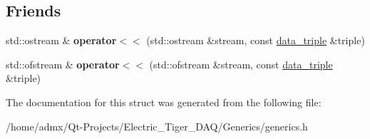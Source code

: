 \subsection*{Friends}
\begin{DoxyCompactItemize}
\item 
\hypertarget{structdata__triple_ae1f2fcec0b69760f3a5a9b97d13ec84d}{std\+::ostream \& {\bfseries operator$<$$<$} (std\+::ostream \&stream, const \hyperlink{structdata__triple}{data\+\_\+triple} \&triple)}\label{structdata__triple_ae1f2fcec0b69760f3a5a9b97d13ec84d}

\item 
\hypertarget{structdata__triple_a7427c6054c2f2b559c384fc92da91e77}{std\+::ofstream \& {\bfseries operator$<$$<$} (std\+::ofstream \&stream, const \hyperlink{structdata__triple}{data\+\_\+triple} \&triple)}\label{structdata__triple_a7427c6054c2f2b559c384fc92da91e77}

\end{DoxyCompactItemize}


The documentation for this struct was generated from the following file\+:\begin{DoxyCompactItemize}
\item 
/home/admx/\+Qt-\/\+Projects/\+Electric\+\_\+\+Tiger\+\_\+\+D\+A\+Q/\+Generics/generics.\+h\end{DoxyCompactItemize}
